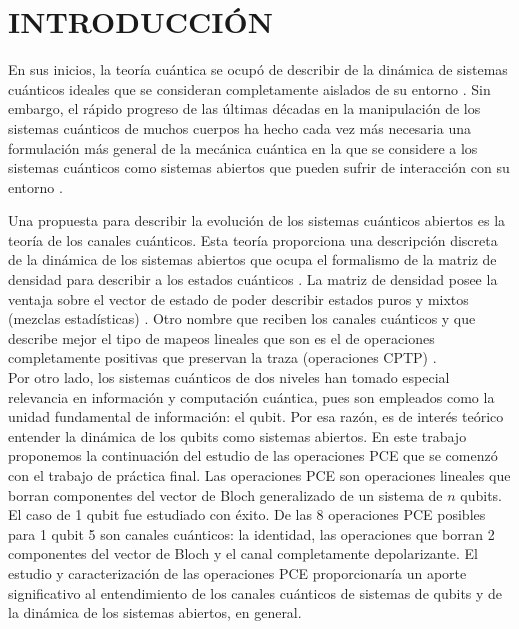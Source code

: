 \chapter{INTRODUCCIÓN}

En sus inicios, la teoría cuántica se ocupó de describir de la dinámica 
de sistemas cuánticos ideales que se consideran completamente aislados 
de su entorno \cite{feynman1965feyman}. Sin embargo, el rápido progreso
de las últimas décadas en la manipulación de los sistemas cuánticos de 
muchos cuerpos ha hecho cada vez más necesaria una formulación 
más general de la mecánica cuántica en la que se considere a 
los sistemas cuánticos como sistemas abiertos que pueden sufrir de 
interacción con su entorno \cite{preskill1998lecture}.

Una propuesta para describir la evolución de los sistemas cuánticos abiertos
es la teoría de los canales cuánticos. Esta teoría proporciona una descripción
discreta de la dinámica de los sistemas abiertos que ocupa el formalismo
de la matriz de densidad para describir a los estados cuánticos
\cite{nielsen_chuang_2011}. La matriz
de densidad posee la ventaja sobre el vector de estado de poder describir
estados puros y mixtos (mezclas estadísticas) \cite{sakurai_napolitano_2017}. 
Otro nombre que reciben 
los canales cuánticos y que describe mejor el tipo de mapeos lineales 
que son es el de operaciones completamente positivas que preservan la traza 
(operaciones CPTP) \cite{bengtsson_zyczkowski_2017}.\\

Por otro lado, los sistemas cuánticos de dos niveles han tomado especial
relevancia en información y computación cuántica, pues son empleados 
como la unidad fundamental de información: el qubit. Por esa razón, es
de interés teórico entender la dinámica de los qubits como sistemas 
abiertos. En este trabajo proponemos la continuación del estudio de 
las operaciones PCE que se comenzó con el trabajo de práctica final.
Las operaciones PCE son operaciones lineales que borran componentes
del vector de Bloch generalizado de un sistema de $n$ qubits. El caso 
de 1 qubit fue estudiado con éxito. De las 8 operaciones PCE posibles para
1 qubit 5 son canales cuánticos: la identidad, las operaciones que borran 2 
componentes del vector de Bloch y el canal completamente depolarizante.
El estudio y caracterización de las operaciones PCE proporcionaría 
un aporte significativo al entendimiento de los canales cuánticos de
sistemas de qubits y de la dinámica de los sistemas abiertos, en general.\\


